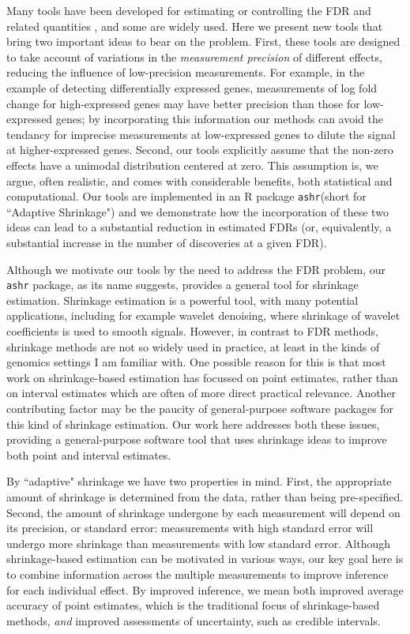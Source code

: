 \documentclass[11pt]{article}
\def\ashr{{\tt ashr}\xspace}
\begin{document}
Many tools have been developed for estimating or controlling the FDR and related quantities \cite{}, and some are widely used.
Here we present new tools that bring two important ideas to bear on the problem.
First, these tools are designed to take account of variations in the {\it measurement precision} of different effects, reducing the influence of low-precision measurements.
For example, in the example of detecting differentially expressed genes, measurements of log fold change for high-expressed genes 
may have better precision than those for low-expressed genes; by incorporating this information our methods can avoid the tendancy for 
imprecise measurements at low-expressed genes to dilute the signal at higher-expressed genes.
Second, our tools explicitly assume that the non-zero effects have a unimodal distribution centered at zero. This assumption 
is, we argue, often realistic, and comes with considerable benefits, both statistical and computational. 
Our tools are implemented in an R package \ashr (short for ``Adaptive Shrinkage") and we 
demonstrate how the incorporation of these two ideas can lead to a substantial reduction in estimated FDRs (or, equivalently,
a substantial increase in the number of discoveries at a given FDR).  

Although we motivate our tools by the need to address the FDR problem, our \ashr package, as its name suggests, 
provides a general tool for shrinkage estimation. Shrinkage estimation is a powerful tool, with many potential applications, including for example wavelet denoising, 
where shrinkage of wavelet coefficients is used to smooth signals. 
However, in contrast to FDR methods, shrinkage methods are not so widely used in practice, at least in the kinds
of genomics settings I am familiar with. One possible reason for this is that most work on shrinkage-based estimation has focussed
on point estimates, rather than on interval estimates which are often of more direct practical relevance. Another contributing
factor may be the paucity of general-purpose software packages for this kind of shrinkage estimation.
Our work here addresses both these issues, providing a general-purpose software tool that uses shrinkage ideas to improve both
point and interval estimates.


By ``adaptive" shrinkage we 
have two properties in mind. First, the appropriate amount of shrinkage is determined from the data, rather than being pre-specified.
Second, the amount of shrinkage undergone by each measurement will depend on its precision, or standard error: measurements with high standard error will undergo more shrinkage than measurements with low standard error.  
Although shrinkage-based estimation can be motivated in various ways, our key goal here is to combine information across the multiple measurements to improve inference for each individual effect. By improved inference, we mean both
improved average accuracy of point estimates, which is
the traditional focus of shrinkage-based methods, \emph{and} improved assessments of uncertainty, such as credible intervals. 
\end{document}

